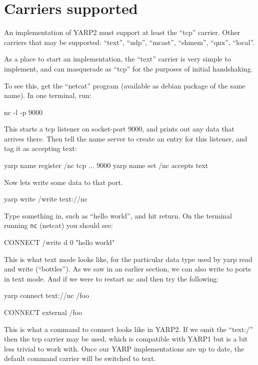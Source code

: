 

\section{Carriers supported}

An implementation of YARP2 must support at least the ``tcp'' carrier.
Other carriers that may be supported:
``text'', ``udp'', ``mcast'', ``shmem'', ``qnx'', ``local''.

As a place to start an implementation, the ``text'' carrier is very
simple to implement, and can masquerade as ``tcp'' for the purposes
of initial handshaking.

To see this, get the ``netcat'' program (available as debian package
of the same name).  In one terminal, run:
%
\begin{code}
nc -l -p 9000
\end{code}
%
This starts a tcp listener on socket-port 9000, and prints out
any data that arrives there.  Then tell the name server to
create an entry for this listener, and tag it as accepting text:
%
\begin{code}
yarp name register /nc tcp ... 9000
yarp name set /nc accepts text
\end{code}
%
Now lets write some data to that port.
%
\begin{code}
yarp write /write text://nc
\end{code}
%
Type something in, such as ``hello world'', and hit return.
On the terminal running {\tt nc} (netcat) you should see:
%
\begin{code}
CONNECT /write
d
0 "hello world"
\end{code}
%
This is what text mode looks like, for the particular
data type used by yarp read and write (``bottles'').  
As we saw in an earlier section, we can also write to ports in text mode.
And if we were to restart nc and then try the following:
%
\begin{code}
yarp connect text://nc /foo
\end{code}
%
\begin{code}
CONNECT external
/foo
\end{code}
%
This is what a command to connect looks like in YARP2.  If we omit the
``text:/'' then the tcp carrier may be used, which is compatible with YARP1
but is a bit less trivial to work with.  Once our YARP implementations
are up to date, the default command carrier will be switched to text.


